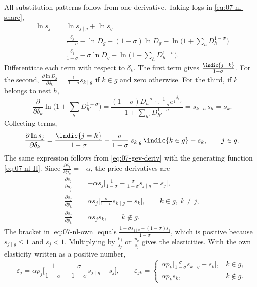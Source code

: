 All substitution patterns follow from one derivative. Taking logs in \eqref{eq:07-nl-share},
\begin{align*}
\ln s_j &= \ln s_{j \mid g} + \ln s_g \\
&= \frac{\delta_j}{1-\sigma} - \ln D_g + (1-\sigma)\ln D_g - \ln\Big(1 + \sum_h D_h^{1-\sigma}\Big) \\
&= \frac{\delta_j}{1-\sigma} - \sigma\ln D_g - \ln\Big(1 + \sum_h D_h^{1-\sigma}\Big) .
\end{align*}
Differentiate each term with respect to $\delta_k$. The first term gives $\frac{\indic\{j = k\}}{1-\sigma}$. For the
second, $\frac{\partial \ln D_g}{\partial \delta_k} = \frac{1}{1-\sigma}s_{k \mid g}$ if $k \in g$ and zero otherwise.
For the third, if $k$ belongs to nest $h$,
\begin{equation*}
\frac{\partial}{\partial \delta_k}\ln\Big(1 + \sum_{h'} D_{h'}^{1-\sigma}\Big)
= \frac{(1-\sigma)D_h^{-\sigma}\cdot\frac{1}{1-\sigma}e^{\frac{\delta_k}{1-\sigma}}}{1 + \sum_{h'}D_{h'}^{1-\sigma}}
= s_{k \mid h}\,s_h = s_k .
\end{equation*}
Collecting terms,
\begin{equation}\label{eq:07-nl-dlns}
\frac{\partial \ln s_j}{\partial \delta_k} = \frac{\indic\{j = k\}}{1-\sigma} - \frac{\sigma}{1-\sigma}\,s_{k \mid g}\,\indic\{k \in g\} - s_k ,
\qquad j \in g .
\end{equation}
The same expression follows from \eqref{eq:07-gev-deriv} with the generating function \eqref{eq:07-nl-H}. Since
$\frac{\partial \delta_k}{\partial p_k} = -\alpha$, the price derivatives are
\begin{align}
\frac{\partial s_j}{\partial p_j} &= -\alpha s_j\Big[\frac{1}{1-\sigma} - \frac{\sigma}{1-\sigma}s_{j \mid g} - s_j\Big], \label{eq:07-nl-own}\\
\frac{\partial s_j}{\partial p_k} &= \alpha s_j\Big[\frac{\sigma}{1-\sigma}s_{k \mid g} + s_k\Big], \qquad k \in g,\; k \neq j, \label{eq:07-nl-cross-in}\\
\frac{\partial s_j}{\partial p_k} &= \alpha s_j s_k, \qquad k \notin g . \label{eq:07-nl-cross-out}
\end{align}
The bracket in \eqref{eq:07-nl-own} equals $\frac{1 - \sigma s_{j \mid g} - (1-\sigma)s_j}{1-\sigma}$, which is positive
because $s_{j \mid g} \le 1$ and $s_j < 1$. Multiplying by $\frac{p_j}{s_j}$ or $\frac{p_k}{s_j}$ gives the elasticities.
With the own elasticity written as a positive number,
\begin{equation}\label{eq:07-nl-elast}
\varepsilon_j = \alpha p_j\Big[\frac{1}{1-\sigma} - \frac{\sigma}{1-\sigma}s_{j \mid g} - s_j\Big], \qquad
\varepsilon_{jk} =
\begin{cases}
\alpha p_k\Big[\frac{\sigma}{1-\sigma}s_{k \mid g} + s_k\Big], & k \in g, \\[4pt]
\alpha p_k s_k, & k \notin g .
\end{cases}
\end{equation}

